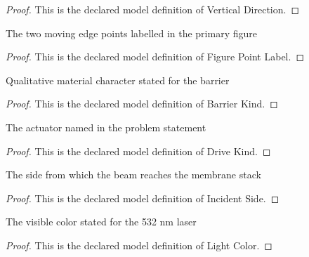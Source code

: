 \begin{proof}
  This is the declared model definition of Vertical Direction.
\end{proof}
\begin{definition}
  \label{def:physics:phyx-mini-0124:phyxminiproblems-problemphyxmini0124-figurepointlabel}
  The two moving edge points labelled in the primary figure
\end{definition}
\begin{proof}
  This is the declared model definition of Figure Point Label.
\end{proof}
\begin{definition}
  \label{def:physics:phyx-mini-0124:phyxminiproblems-problemphyxmini0124-barrierkind}
  Qualitative material character stated for the barrier
\end{definition}
\begin{proof}
  This is the declared model definition of Barrier Kind.
\end{proof}
\begin{definition}
  \label{def:physics:phyx-mini-0124:phyxminiproblems-problemphyxmini0124-drivekind}
  The actuator named in the problem statement
\end{definition}
\begin{proof}
  This is the declared model definition of Drive Kind.
\end{proof}
\begin{definition}
  \label{def:physics:phyx-mini-0124:phyxminiproblems-problemphyxmini0124-incidentside}
  The side from which the beam reaches the membrane stack
\end{definition}
\begin{proof}
  This is the declared model definition of Incident Side.
\end{proof}
\begin{definition}
  \label{def:physics:phyx-mini-0124:phyxminiproblems-problemphyxmini0124-lightcolor}
  The visible color stated for the 532 nm laser
\end{definition}
\begin{proof}
  This is the declared model definition of Light Color.
\end{proof}
